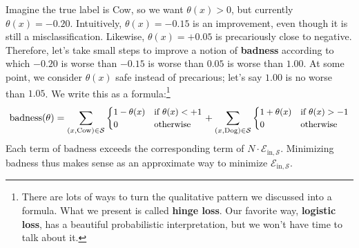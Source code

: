 \documentclass[openany, notitlepage, justified]{tufte-book}
\newcommand{\Ee}{\mathcal{E}}
\newcommand{\Ss}{\mathcal{S}}
\newcommand{\Ein}{\Ee_{\text{in},\Ss}}
\begin{document}
            Imagine the true label is Cow, so we want
            $\theta(x)>0$, but currently
            $\theta(x) = -0.20$.  Intuitively, $\theta(x)=-0.15$ is an
            improvement, even though it is still a misclassification.
            Likewise, $\theta(x)=+0.05$ is precariously close to
            negative.
            Therefore, let's take small steps to improve a notion
            of \textbf{badness} according to which $-0.20$ is
            worse than $-0.15$ is worse than $0.05$ is worse than $1.00$.  At
            some point, we consider $\theta(x)$ safe instead of precarious;
            let's say $1.00$ is no worse than $1.05$.
            We write this as a formula:\footnote{
                There are lots of ways to turn the qualitative pattern we 
                discussed into a formula.  What we present is called
                \textbf{hinge loss}.  Our favorite way, \textbf{logistic
                loss}, has a beautiful probabilistic interpretation,
                but we won't have time to talk about it.
            }
            \begin{align*}
                \text{badness}(\theta) = 
            {\small
                    \sum_{(x,\text{Cow})\in \Ss}
                    \begin{cases} 
                        1-\theta(x)    &   \text{if}~\theta(x) < +1 \\
                        0              &   \text{otherwise}
                    \end{cases}
                    +
                    \sum_{(x,\text{Dog})\in \Ss}
                    \begin{cases} 
                        1+\theta(x)    &   \text{if}~\theta(x) > -1\\
                        0              &   \text{otherwise}
                    \end{cases}
            }
            \end{align*}
            Each term of $\text{badness}$ exceeds the
            corresponding term of $N\cdot \Ein$.  Minimizing badness thus
            makes sense as an approximate way to minimize $\Ein$.
\end{document}
